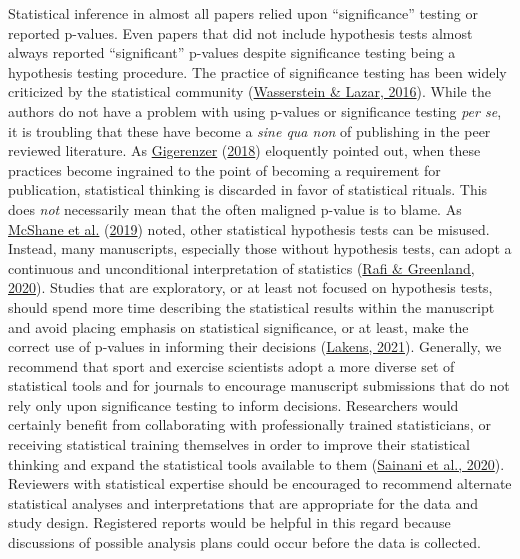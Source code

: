 \documentclass[]{cik}%
\begin{document}
Statistical inference in almost all papers relied upon ``significance''
testing or reported p-values. Even papers that did not include
hypothesis tests almost always reported ``significant'' p-values despite
significance testing being a hypothesis testing procedure. The practice
of significance testing has been widely criticized by the statistical
community (\protect\hyperlink{ref-wasserstein2016asa}{Wasserstein \&
Lazar, 2016}). While the authors do not have a problem with using
p-values or significance testing \emph{per se}, it is troubling that
these have become a \emph{sine qua non} of publishing in the peer
reviewed literature. As
\protect\hyperlink{ref-gigerenzer2018}{Gigerenzer}
(\protect\hyperlink{ref-gigerenzer2018}{2018}) eloquently pointed out,
when these practices become ingrained to the point of becoming a
requirement for publication, statistical thinking is discarded in favor
of statistical rituals. This does \emph{not} necessarily mean that the
often maligned p-value is to blame. As
\protect\hyperlink{ref-mcshane2019abandon}{McShane et al.}
(\protect\hyperlink{ref-mcshane2019abandon}{2019}) noted, other
statistical hypothesis tests can be misused. Instead, many manuscripts,
especially those without hypothesis tests, can adopt a continuous and
unconditional interpretation of statistics
(\protect\hyperlink{ref-rafi2020semantic}{Rafi \& Greenland, 2020}).
Studies that are exploratory, or at least not focused on hypothesis
tests, should spend more time describing the statistical results within
the manuscript and avoid placing emphasis on statistical significance,
or at least, make the correct use of p-values in informing their
decisions (\protect\hyperlink{ref-Lakens2021pvalue}{Lakens, 2021}).
Generally, we recommend that sport and exercise scientists adopt a more
diverse set of statistical tools and for journals to encourage
manuscript submissions that do not rely only upon significance testing
to inform decisions. Researchers would certainly benefit from
collaborating with professionally trained statisticians, or receiving
statistical training themselves in order to improve their statistical
thinking and expand the statistical tools available to them
(\protect\hyperlink{ref-sainani2020}{Sainani et al., 2020}). Reviewers
with statistical expertise should be encouraged to recommend alternate
statistical analyses and interpretations that are appropriate for the
data and study design. Registered reports would be helpful in this
regard because discussions of possible analysis plans could occur before
the data is collected.
\end{document}
